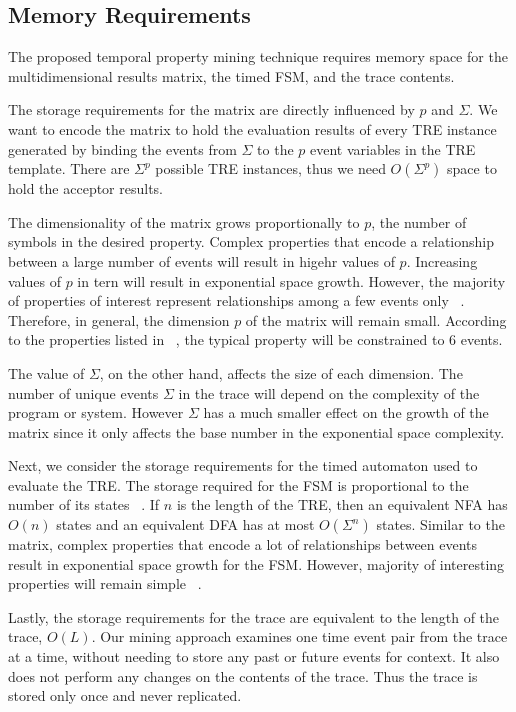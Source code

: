 \documentclass[]{sigplanconf}
\begin{document}
\subsection{Memory Requirements}

The proposed temporal property mining technique requires memory space for the multidimensional results matrix, the timed FSM, and the trace contents.

The storage requirements for the matrix are directly influenced by $p$ and $\Sigma$.
We want to encode the matrix to hold the evaluation results of every TRE instance generated by binding the events from $\Sigma$ to the $p$ event variables in the TRE template. There are $\Sigma^p$ possible TRE instances, thus we need $O(\Sigma^p)$ space to hold the acceptor results.

The dimensionality of the matrix grows proportionally to $p$, the number of symbols in the desired property.
Complex properties that encode a relationship between a large number of events will result in higehr values of $p$.
Increasing values of $p$ in tern will result in exponential space growth.
However, the majority of properties of interest represent relationships among a few events only ~\cite{evans1, dwyer1999patterns}.
Therefore, in general, the dimension $p$ of the matrix will remain small.
According to the properties listed in ~\cite{dwyer1999patterns, dwyer2}, the typical property will be constrained to 6 events.

The value of $\Sigma$, on the other hand, affects the size of each dimension.
The number of unique events $\Sigma$ in the trace will depend on the complexity of the program or system.
However $\Sigma$ has a much smaller effect on the growth of the matrix since it only affects the base number in the
exponential space complexity.


Next, we consider the storage requirements for the timed automaton used to evaluate the TRE.
The storage required for the FSM is proportional to the number of its states ~\cite{book1}.
If $n$ is the length of the TRE, then an equivalent NFA has $O(n)$ states and an equivalent DFA has at most $O(\Sigma^n)$ states. Similar to the matrix, complex properties that encode a lot of relationships between events result in exponential space growth for the FSM. However, majority of interesting properties will remain simple ~\cite{dwyer1999patterns}.


Lastly, the storage requirements for the trace are equivalent to the length of the trace, $O(L)$.
Our mining approach examines one time event pair from the trace at a time, without needing to
store any past or future events for context. It also does not perform any changes on the
contents of the trace. Thus the trace is stored only once and never replicated.
\end{document}
